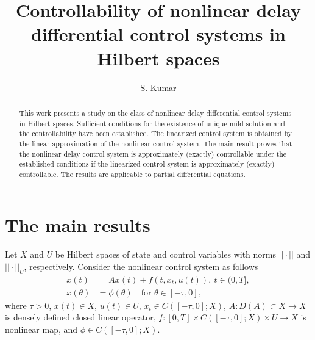 \documentclass[12pt]{llncs}
\begin{document}
\fi

\title{Controllability of nonlinear delay differential control systems in Hilbert spaces}

\author{S. Kumar }

\maketitle

\begin{abstract}
This work presents a study on the class of nonlinear delay differential control systems in Hilbert spaces. Sufficient conditions for the existence of unique mild solution and the controllability have been established. The linearized control system is obtained by the linear approximation of the nonlinear control system. The main result proves that the nonlinear delay control system is approximately (exactly) controllable under the established conditions if the linearized control system is approximately (exactly) controllable. The results are applicable to partial differential equations.
%


\end{abstract}


\section{The main results}

Let $X$ and $U$ be Hilbert spaces of state and control variables with norms $||\cdot||$ and $||\cdot||_U$, respectively. Consider the nonlinear control system as follows
\begin{subequations}\label{eqn-main-nls-main}
\begin{align}
\dot{x}(t) &= A x(t) + f(t, x_t, u(t)), ~ t \in (0,T], \label{eqn-main-nls} \\
x(\theta) &= \phi(\theta) \quad \text{for  } \theta \in [-\tau,0], \label{eqn-main-ic}
\end{align}
\end{subequations}
where $\tau>0$, $x(t) \in X$, $u(t) \in U$, $x_t \in C([-\tau,0];X)$, $A : D(A) \subset X \rightarrow X$ is densely defined closed linear operator, $f: [0,T] \times C([-\tau,0];X) \times U \rightarrow X$ is nonlinear map, and $\phi \in C([-\tau,0];X)$.
\end{document}
